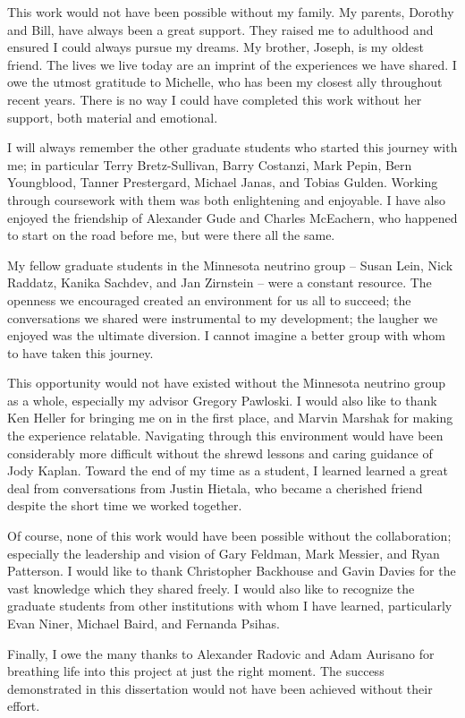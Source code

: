 
This work would not have been possible without my family.
My parents, Dorothy and Bill, have always been a great support.
They raised me to adulthood and ensured I could always pursue
my dreams.
My brother, Joseph, is my oldest friend.
The lives we live today are an imprint of the experiences we have shared.
I owe the utmost gratitude to Michelle, who has been my closest ally
throughout recent years.
There is no way I could have completed this work without her support,
both material and emotional.

I will always remember the other graduate students who
started this journey with me; in particular
Terry Bretz-Sullivan, Barry Costanzi, Mark Pepin, Bern Youngblood,
Tanner Prestergard, Michael Janas, and Tobias Gulden.
Working through coursework with them was both enlightening and
enjoyable.
I have also enjoyed the friendship of Alexander Gude and Charles McEachern,
who happened to start on the road before me, but were there all the same.

My fellow graduate students in the Minnesota neutrino group --
Susan Lein, Nick Raddatz, Kanika Sachdev, and Jan Zirnstein  --
were a constant resource.
The openness we encouraged created an environment for us all to succeed;
the conversations we shared were instrumental to my development;
the laugher we enjoyed was the ultimate diversion.
I cannot imagine a better group with whom to have taken this journey.

This opportunity would not have existed without the Minnesota neutrino group
as a whole, especially my advisor Gregory Pawloski.
I would also like to thank Ken Heller for bringing me on in the first place,
and Marvin Marshak for making the experience relatable.
Navigating through this environment would have been considerably more
difficult without the shrewd lessons and caring guidance of Jody Kaplan.
Toward the end of my time as a student, I learned learned a great deal from
conversations from Justin Hietala, who became a cherished friend despite the
short time we worked together.

Of course, none of this work would have been possible without the \nova
collaboration; especially the leadership and vision of Gary Feldman,
Mark Messier, and Ryan Patterson.
I would like to thank Christopher Backhouse and Gavin Davies
for the vast knowledge which they shared freely.
I would also like to recognize the graduate students from
other institutions with whom I have learned, particularly
Evan Niner, Michael Baird, and Fernanda Psihas.

Finally, I owe the many thanks to Alexander Radovic and Adam Aurisano
for breathing life into this project at just the right moment.
The success demonstrated in this dissertation
would not have been achieved without their effort.

